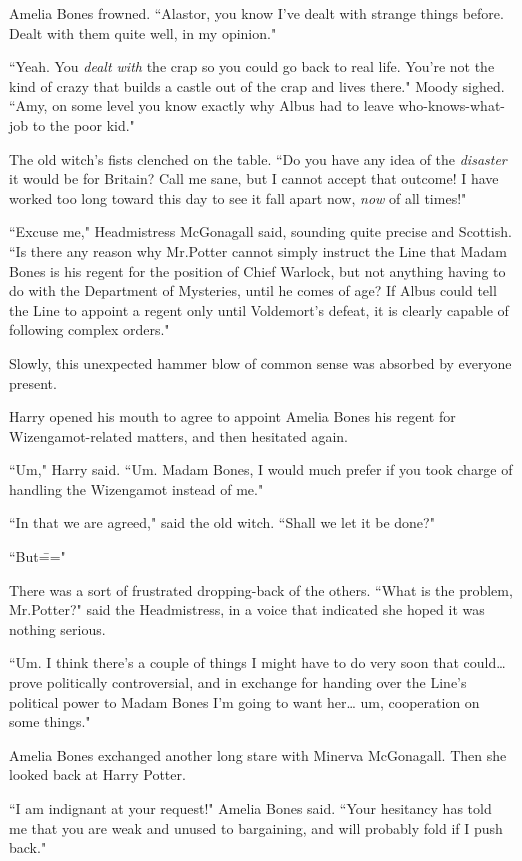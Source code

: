 Amelia Bones frowned. ``Alastor, you know I've dealt with strange things before. Dealt with them quite well, in my opinion."

``Yeah. You \emph{dealt with} the crap so you could go back to real life. You're not the kind of crazy that builds a castle out of the crap and lives there." Moody sighed. ``Amy, on some level you know exactly why Albus had to leave who-knows-what-job to the poor kid."

The old witch's fists clenched on the table. ``Do you have any idea of the \emph{disaster} it would be for Britain? Call me sane, but I cannot accept that outcome! I have worked too long toward this day to see it fall apart now, \emph{now} of all times!"

``Excuse me," Headmistress McGonagall said, sounding quite precise and Scottish. ``Is there any reason why Mr.\?Potter cannot simply instruct the Line that Madam Bones is his regent for the position of Chief Warlock, but not anything having to do with the Department of Mysteries, until he comes of age? If Albus could tell the Line to appoint a regent only until Voldemort's defeat, it is clearly capable of following complex orders."

Slowly, this unexpected hammer blow of common sense was absorbed by everyone present.

Harry opened his mouth to agree to appoint Amelia Bones his regent for Wizengamot-related matters, and then hesitated again.

``Um," Harry said. ``Um. Madam Bones, I would much prefer if you took charge of handling the Wizengamot instead of me."

``In that we are agreed," said the old witch. ``Shall we let it be done?"

``But\==="

There was a sort of frustrated dropping-back of the others. ``What is the problem, Mr.\?Potter?" said the Headmistress, in a voice that indicated she hoped it was nothing serious.

``Um. I think there's a couple of things I might have to do very soon that could{\ldots} prove politically controversial, and in exchange for handing over the Line's political power to Madam Bones I'm going to want her{\ldots} um, cooperation on some things."

Amelia Bones exchanged another long stare with Minerva McGonagall. Then she looked back at Harry Potter.

``I am indignant at your request!" Amelia Bones said. ``Your hesitancy has told me that you are weak and unused to bargaining, and will probably fold if I push back."

